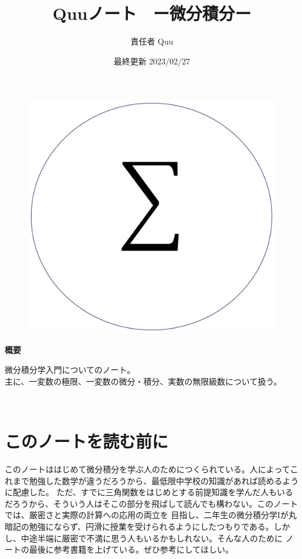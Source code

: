 \documentclass[a4j,dvipdfmx]{jsarticle}
\title{Quuノート　ー微分積分\ajRoman{1}ー}
\date{最終更新 2023/02/27}
\author{責任者 Quu}
\begin{document}
    \maketitle
    \thispagestyle{empty}
    \begin{figure}[h]
        \centering
        \includegraphics[scale=0.5]{img/QuuNote/icon.png}
    \end{figure}
    
    \centerline{\textbf{概要}}
    \noindent
    微分積分学入門についてのノート。\\
    主に、一変数の極限、一変数の微分・積分、実数の無限級数について扱う。
    
    \clearpage
    　
    \clearpage
    \part*{このノートを読む前に}
        このノートははじめて微分積分を学ぶ人のためにつくられている。人によってこれまで勉強した数学が違うだろうから、最低限中学校の知識があれば読めるように配慮した。
        ただ、すでに三角関数をはじめとする前提知識を学んだ人もいるだろうから、そういう人はそこの部分を飛ばして読んでも構わない。このノートでは、厳密さと実際の計算への応用の両立を
        目指し、二年生の微分積分学Iが丸暗記の勉強にならず、円滑に授業を受けられるようにしたつもりである。しかし、中途半端に厳密で不満に思う人もいるかもしれない。そんな人のために
        ノートの最後に参考書籍を上げている。ぜひ参考にしてほしい。
\end{document}
